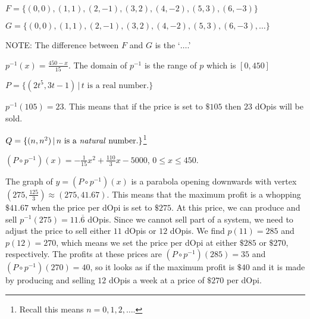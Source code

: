 \documentclass{ximera}
\begin{document}
\begin{question}
$F = \{ (0,0), (1,1), (2,-1), (3,2), (4,-2), (5,3), (6,-3)  \}$
\begin{solution}
\end{solution}

\end{question}

\begin{question}
$G = \{ (0,0), (1,1), (2,-1), (3,2), (4,-2), (5,3), (6,-3), \ldots \}$  

NOTE:  The difference between $F$ and $G$ is the  `$\ldots$.'
\begin{solution}
$p^{-1}(x) = \frac{450-x}{15}$.  The domain of $p^{-1}$ is the range of $p$ which is $[0,450]$
\end{solution}

\end{question}

\begin{question}
$P = \{ (2t^5, 3t-1) \, | \, \text{$t$ is a real number.} \}$
\begin{solution}
$p^{-1}(105) = 23$. This means that if the price is set to $\$105$ then $23$ dOpis will be sold.
\end{solution}

\end{question}

\begin{question}
$Q = \{ (n, n^2) \, | \, \text{$n$ is a \textit{natural} number.} \}$\footnote{Recall this means $n = 0, 1, 2, \ldots$.}
\begin{solution}
$\left(P\circ p^{-1}\right)(x) = -\frac{1}{15} x^2 + \frac{110}{3} x - 5000$, $0 \leq x \leq 450$.  

\smallskip

The graph of $y = \left(P\circ p^{-1}\right)(x)$ is a parabola opening downwards with vertex $\left(275, \frac{125}{3}\right) \approx (275, 41.67)$.  This means that the maximum profit is a whopping $\$41.67$ when the price per dOpi is set to $\$275$.   At this price, we can produce and sell $p^{-1}(275) = 11.\overline{6}$ dOpis.  Since we cannot sell part of a system, we need to adjust the price to sell either $11$ dOpis or $12$ dOpis. We find $p(11) = 285$ and $p(12) = 270$, which means we set the price per dOpi at either $\$285$ or $\$270$, respectively.  The profits at these prices are $\left(P\circ p^{-1}\right)(285) = 35$ and  $\left(P\circ p^{-1}\right)(270) = 40$, so it looks as if the maximum profit is $\$40$ and it is made by producing and selling $12$ dOpis a week at a price of $\$270$ per dOpi.
\end{solution}

\end{question}
\end{document}
